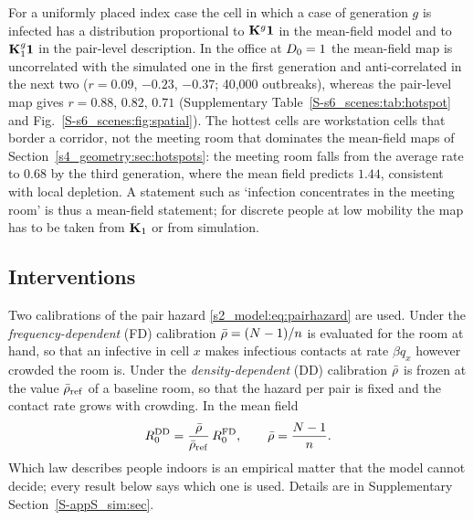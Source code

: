 For a uniformly placed index case the cell in which a case of generation $g$ is infected has a distribution
proportional to $\mathbf{K}^{g}\boldsymbol{1}$ in the mean-field model and to $\mathbf{K}_1^{g}\boldsymbol{1}$ in the pair-level description.
In the office at $D_0=1$ the mean-field map is uncorrelated with the simulated one in the first generation and
anti-correlated in the next two ($r=0.09$, $-0.23$, $-0.37$; 40{,}000 outbreaks), whereas the pair-level map gives
$r=0.88$, $0.82$, $0.71$ (Supplementary Table~\ref{S-s6_scenes:tab:hotspot} and
Fig.~\ref{S-s6_scenes:fig:spatial}). The hottest cells are workstation cells that border a corridor, not the
meeting room that dominates the mean-field maps of Section~\ref{s4_geometry:sec:hotspots}: the meeting room falls
from the average rate to $0.68$ by the third generation, where the mean field predicts $1.44$, consistent with
local depletion. A statement such as `infection concentrates in the meeting room' is thus a mean-field
statement; for discrete people at low mobility the map has to be taken from $\mathbf{K}_1$ or from simulation.

\subsection{Interventions}\label{s6_scenes:sec:interventions}

Two calibrations of the pair hazard \eqref{s2_model:eq:pairhazard} are used. Under the
\emph{frequency-dependent} (FD) calibration $\bar{\rho}=(N-1)/n$ is evaluated for the room at hand, so
that an infective in cell $x$ makes infectious contacts at rate $\beta q_x$ however crowded the room is. Under
the \emph{density-dependent} (DD) calibration $\bar{\rho}$ is frozen at the value $\bar{\rho}_{\mathrm{ref}}$ of a
baseline room, so that the hazard per pair is fixed and the contact rate grows with crowding. In the mean field
\begin{equation}\label{s7_interventions:eq:dd}
  R_0^{\mathrm{DD}}=\frac{\bar{\rho}}{\bar{\rho}_{\mathrm{ref}}}\,R_0^{\mathrm{FD}},\qquad
  \bar{\rho}=\frac{N-1}{n}.
\end{equation}
Which law describes people indoors is an empirical matter \citep{mccallum2001should,begon2002clarification}
that the model cannot decide; every result below says which one is used. Details are in Supplementary
Section~\ref{S-appS_sim:sec}.

